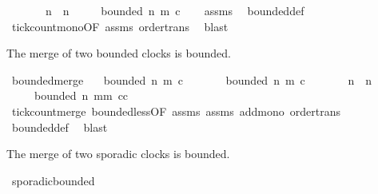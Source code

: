 \begin{isabellebody}
\ \ \ \ \ \ \ {\isacartoucheopen}n{\isacharprime}\ {\isasymge}\ n{\isacartoucheclose}\isanewline
\ \ \ \ \ {\isacartoucheopen}bounded\ n\ m\ c{\isacartoucheclose}\isanewline
%
\isadelimproof
\ \ %
\endisadelimproof
%
\isatagproof
{}\isamarkupfalse%
\ assms{\isacharparenleft}{}{\isacharparenright}\ \isamarkupfalse%
\ bounded{\isacharunderscore}def\isanewline
\ \ \isamarkupfalse%
\ tick{\isacharunderscore}count{\isacharunderscore}mono{\isacharbrackleft}OF\ assms{\isacharparenleft}{}{\isacharparenright}{\isacharbrackright}\ order{\isacharunderscore}trans\ \isamarkupfalse%
\ blast%
\endisatagproof
{\isafoldproof}%
%
\isadelimproof
%
\endisadelimproof
%
\begin{isamarkuptext}%
The merge of two bounded clocks is bounded.%
\end{isamarkuptext}\isamarkuptrue%
\isamarkupfalse%
\ bounded{\isacharunderscore}merge{\isacharcolon}\isanewline
\ \ \ {\isacartoucheopen}bounded\ n\ m\ c{\isacartoucheclose}\isanewline
\ \ \ \ \ \ \ {\isacartoucheopen}bounded\ n{\isacharprime}\ m{\isacharprime}\ c{\isacharprime}{\isacartoucheclose}\isanewline
\ \ \ \ \ \ \ {\isacartoucheopen}n{\isacharprime}\ {\isasymge}\ n{\isacartoucheclose}\isanewline
\ \ \ \ \ {\isacartoucheopen}bounded\ n\ {\isacharparenleft}m{\isacharplus}m{\isacharprime}{\isacharparenright}\ {\isacharparenleft}c{\isasymoplus}c{\isacharprime}{\isacharparenright}{\isacartoucheclose}\isanewline
%
\isadelimproof
%
\endisadelimproof
%
\isatagproof
{}\isamarkupfalse%
\ tick{\isacharunderscore}count{\isacharunderscore}merge\ bounded{\isacharunderscore}less{\isacharbrackleft}OF\ assms{\isacharparenleft}{}{\isacharcomma}{}{\isacharparenright}{\isacharbrackright}\ assms{\isacharparenleft}{}{\isacharcomma}{}{\isacharparenright}\ add{\isacharunderscore}mono\ order{\isacharunderscore}trans\isanewline
\ \ \isamarkupfalse%
\ bounded{\isacharunderscore}def\ \isamarkupfalse%
\ blast%
\endisatagproof
{\isafoldproof}%
%
\isadelimproof
%
\endisadelimproof
%
\begin{isamarkuptext}%
The merge of two sporadic clocks is bounded.%
\end{isamarkuptext}\isamarkuptrue%
\isamarkupfalse%
\ sporadic{\isacharunderscore}bounded{}{\isacharcolon}\isanewline

\end{isabellebody}
